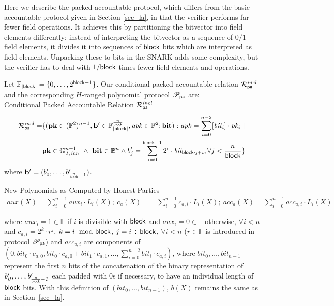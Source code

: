 
Here we describe the packed accountable protocol, which differs from the basic accountable protocol given in Section \ref{sec_la}, in that the verifier performs far fewer field operations. It achieves this by partitioning the bitvector into field elements differently:  instead of interpreting the bitvector as a sequence of $0/1$ field elements, it divides it into sequences of $\mathsf{block}$ bits which are interpreted as field elements. Unpacking these to bits in the SNARK adds some complexity, but the verifier has to deal with $1/\mathsf{block}$ times fewer field elements and operations.


Let $\mathbb{F}_{|\mathsf{block}|} = \{0, \ldots, 2^{\mathsf{block} -1} \}$. %
Our conditional packed accountable relation $\mathcal{R}^{\mathit{incl}}_{\mathsf{pa}}$ and the corresponding $H$-ranged polynomial protocol 
$\mathscr{P}_{\mathsf{pa}}$ are:\\
 
\noindent \textsf{Conditional Packed Accountable Relation $\mathcal{R}^{\mathit{incl}}_{\mathsf{pa}}$} 
\begin{equation*}
\begin{split}
\mathcal{R}^{\mathit{incl}}_{\mathsf{pa}} = & \{(\mathbf{pk} \in (\mathbb{F}^2)^{n-1},\mathbf{b'} \in \mathbb{F}_{|\mathsf{block}|}^{\frac{n}{\mathsf{block}}},
\mathit{apk} \in \mathbb{F}^2; \mathbf{bit}) : \mathit{apk} = \sum_{i=0}^{n-2} [\mathit{bit_i}] \cdot \mathit{pk_i} \ | \\ 
& \mathbf{pk} \in \mathbb{G}_{\mathit{1,inn}}^{n-1} \ \wedge \ \mathbf{bit} \in \mathbb{B}^n  \wedge b'_{j} = \sum_{i=0}^{\mathsf{block} -1}2^i \cdot \mathit{bit_{\mathsf{block} \cdot j + i}}, \forall j < \frac{n}{\mathsf{block}} \} 
\end{split}
\end{equation*}
where $\mathbf{b'} = (b'_{0}, \ldots, b'_{{\frac{n}{\mathsf{block}}} -1})$.

\noindent \textsf{New Polynomials as Computed by Honest Parties} 
\begin{align*}
aux(X) =  \sum_{i=0}^{n-1}aux_i \cdot L_i(X); \ c_{a}(X) = & \sum_{i=0}^{n-1} c_{a,i} \cdot L_i(X); \ acc_{a}(X)  =   \sum_{i=0}^{n-1} acc_{a,i}  \cdot L_i(X)
\end{align*}

\noindent where $aux_{i} = 1 \in \mathbb{F}$ if $i$ is divisible with $\mathsf{block}$ and $aux_{i} = 0 \in \mathbb{F}$ otherwise, $\forall i < n$ 
and $c_{a,i} = 2^k \cdot r^j$, $k = i \mod {\mathsf{block}}$, $j = i \div \mathsf{block}$, $\forall i < n$ ($r \in \mathbb{F}$ is introduced in protocol $\mathscr{P}_{\mathsf{pa}}$) and $acc_{a,i}$ are components of $(0, \mathit{bit}_0 \cdot c_{a,0}, \mathit{bit}_0 \cdot c_{a,0}+ \mathit{bit}_1  \cdot c_{a,1}, \ldots, \sum_{i=0}^{n-2}\mathit{bit}_i \cdot c_{a,i})$, where $\mathit{bit_{0}}, \ldots, \mathit{bit_{n-1}}$ represent the first $n$ 
bits of the concatenation of the binary representation of 
$\mathit{b'_{0}}, \ldots, \mathit{b'_{\frac{n}{\mathsf{block}}-1}}$ each 
padded  with 0s  if necessary, to have an individual length of $\mathsf{block}$ bits. With this definition of $(\mathit{bit_{0}}, \ldots, \mathit{bit_{n-1}})$, $b(X)$ remains the same as in Section~\ref{sec_la}.\\

